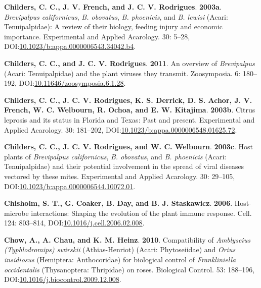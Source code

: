 \documentclass[12pt,final,CPage]{ufthesis}
\newlength{\cslhangindent}
\newenvironment{CSLReferences}[2] %
{%
	\setlength{\parindent}{0pt}
	\ifodd #1 \everypar{\setlength{\hangindent}{\cslhangindent}}\ignorespaces\fi
	\ifnum #2 > 0
	\setlength{\parskip}{#2\baselineskip}
	\fi
}%
{}
\begin{document}
{\begin{CSLReferences}{1}{0}
  \leavevmode{}%
  \textbf{Childers, C. C., J. V. French, and J. C. V. Rodrigues}. \textbf{2003a}. {\emph{Brevipalpus californicus}}, {\emph{B. obovatus}}, {\emph{B. phoenicis}}, and {\emph{B. lewisi}} ({Acari}: {Tenuipalpidae}): A review of their biology, feeding injury and economic importance. Experimental and Applied Acarology. 30: 5--28, DOI:\href{https://doi.org/10.1023/b:appa.0000006543.34042.b4}{10.1023/b:appa.0000006543.34042.b4}.

  \leavevmode{}%
  \textbf{Childers, C. C., and J. C. V. Rodrigues}. \textbf{2011}. An overview of {\emph{Brevipalpus}} ({Acari}: {Tenuipalpidae}) and the plant viruses they transmit. Zoosymposia. 6: 180--192, DOI:\href{https://doi.org/10.11646/zoosymposia.6.1.28}{10.11646/zoosymposia.6.1.28}.

  \leavevmode{}%
  \textbf{Childers, C. C., J. C. V. Rodrigues, K. S. Derrick, D. S. Achor, J. V. French, W. C. Welbourn, R. Ochoa, and E. W. Kitajima}. \textbf{2003b}. {Citrus leprosis} and its status in {Florida} and {Texas}: Past and present. Experimental and Applied Acarology. 30: 181--202, DOI:\href{https://doi.org/10.1023/b:appa.0000006548.01625.72}{10.1023/b:appa.0000006548.01625.72}.

  \leavevmode{}%
  \textbf{Childers, C. C., J. C. V. Rodrigues, and W. C. Welbourn}. \textbf{2003c}. Host plants of {\emph{Brevipalpus californicus}}, {\emph{B. obovatus}}, and {\emph{B. phoenicis}} ({Acari}: {Tenuipalpidae}) and their potential involvement in the spread of viral diseases vectored by these mites. Experimental and Applied Acarology. 30: 29--105, DOI:\href{https://doi.org/10.1023/b:appa.0000006544.10072.01}{10.1023/b:appa.0000006544.10072.01}.

  \leavevmode{}%
  \textbf{Chisholm, S. T., G. Coaker, B. Day, and B. J. Staskawicz}. \textbf{2006}. Host-microbe interactions: Shaping the evolution of the plant immune response. Cell. 124: 803--814, DOI:\href{https://doi.org/10.1016/j.cell.2006.02.008}{10.1016/j.cell.2006.02.008}.

  \leavevmode{}%
  \textbf{Chow, A., A. Chau, and K. M. Heinz}. \textbf{2010}. Compatibility of {\emph{Amblyseius (Typhlodromips) swirskii}} ({Athias-Henriot}) ({Acari: Phytoseiidae}) and {\emph{Orius insidiosus}} ({Hemiptera}: {Anthocoridae}) for biological control of {\emph{Frankliniella occidentalis}} ({Thysanoptera:} {Thripidae}) on roses. Biological Control. 53: 188--196, DOI:\href{https://doi.org/10.1016/j.biocontrol.2009.12.008}{10.1016/j.biocontrol.2009.12.008}.


\end{CSLReferences}}
\end{document}
